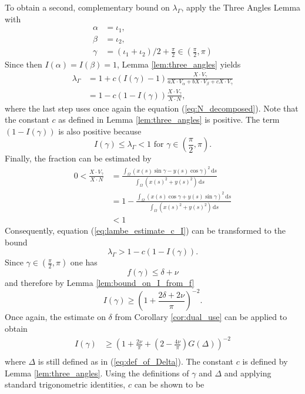 \documentclass{article}
\newcommand{\ds}{\,\mathrm{d}s}
\begin{document}
To obtain a second, complementary bound on $\lambda_\Gamma$, apply the Three Angles Lemma with 
\begin{align*}
    \alpha &= \iota_1,\\
    \beta &= \iota_2,\\
    \gamma &= (\iota_1 + \iota_2)/2 + \frac\pi2 \in (\frac\pi2,\pi)
\end{align*}
Since then $I(\alpha) = I(\beta) = 1$, Lemma \ref{lem:three_angles} yields
\begin{align} \label{eq:lambe_estimate_c_I}
    \lambda_\Gamma &= 1 + c (I(\gamma)-1) \frac{X\cdot V_\gamma}{aX\cdot V_\alpha + bX\cdot V_\beta + cX\cdot V_\gamma} \nonumber\\
    &=1 - c (1-I(\gamma)) \frac{X\cdot V_\gamma}{X \cdot N},
\end{align}
where the last step uses once again the equation (\ref{eq:N_decomposed}).
Note that the constant $c$ as defined in Lemma \ref{lem:three_angles} is positive. The term $(1-I(\gamma))$ is also positive because
\[I(\gamma) \le \lambda_\Gamma < 1 \text{ for } \gamma \in (\frac\pi2,\pi).\]
Finally, the fraction can be estimated by
\begin{align*}
    0 < \frac{X\cdot V_\gamma}{X \cdot N} &= \frac{\int_\Omega (x(s) \sin\gamma - y(s)\cos\gamma)^2 \ds}{\int_\Omega(x(s)^2 + y(s)^2) \ds}\\
     &= 1- \frac{\int_\Omega (x(s) \cos\gamma + y(s)\sin\gamma)^2 \ds}{\int_\Omega(x(s)^2 + y(s)^2) \ds}\\
     &< 1
\end{align*}
Consequently, equation (\ref{eq:lambe_estimate_c_I}) can be transformed to the bound
\begin{equation} \label{eq:estimate_lambda_c_I_gamma}
    \lambda_\Gamma > 1 - c(1-I(\gamma)).
\end{equation}
Since $\gamma \in (\frac\pi2,\pi)$ one has
\[f(\gamma) \le \delta + \nu\]
and therefore by Lemma \ref{lem:bound_on_I_from_f}
\[I(\gamma) \ge \left(1+\frac{2\delta + 2\nu}{\pi}\right)^{-2}.\]
Once again, the estimate on $\delta$ from Corollary \ref{cor:dual_use} can be applied to obtain
\begin{align*} 
    I(\gamma) &\ge \left(1+ \frac{2\nu}\pi+ \left(2 -\frac{4\nu}\pi\right)G(\Delta)\right)^{-2}\\
\end{align*}
where $\Delta$ is still defined as in (\ref{eq:def_of_Delta}).
The constant $c$ is defined by Lemma \ref{lem:three_angles}. Using the definitions of $\gamma$ and $\Delta$ and applying standard trigonometric identities, $c$ can be shown to be
\end{document}
